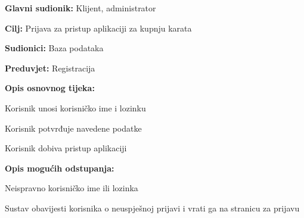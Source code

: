 					\noindent {}
					\begin{packed_item}
	
						\item \textbf{Glavni sudionik: } Klijent, administrator
						\item  \textbf{Cilj:} Prijava za pristup aplikaciji za kupnju karata
						\item  \textbf{Sudionici:} Baza podataka
						\item  \textbf{Preduvjet:} Registracija
						\item  \textbf{Opis osnovnog tijeka:}
						
						\item[] \begin{packed_enum}
	
							\item Korisnik unosi korisničko ime i lozinku
							\item Korisnik potvrđuje navedene podatke
							\item Korisnik dobiva pristup aplikaciji
							
						\end{packed_enum}
						
						\item  \textbf{Opis mogućih odstupanja:}
						
						\item[] \begin{packed_item}
	
							\item[2.a] Neispravno korisničko ime ili lozinka
							\item[] \begin{packed_enum}
								
								\item Sustav obavijesti korisnika o neuspješnoj prijavi i vrati ga na stranicu za prijavu 
								
							\end{packed_enum}
							
						\end{packed_item}
					\end{packed_item}
					
